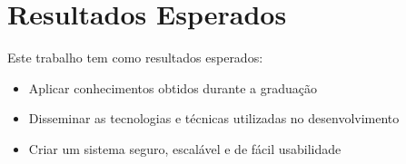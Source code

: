 \documentclass[	12pt, Times, openright, twoside, a4paper, english, brazil]{abntex2}
\begin{document}
\section{Resultados Esperados}
Este trabalho tem como resultados esperados:
\begin{itemize}
 \item Aplicar conhecimentos obtidos durante a graduação
 \item Disseminar as tecnologias e técnicas utilizadas no desenvolvimento 
 \item Criar um sistema seguro, escalável e de fácil usabilidade 
\end{itemize}






\postextual


%


%
%

\end{document}
